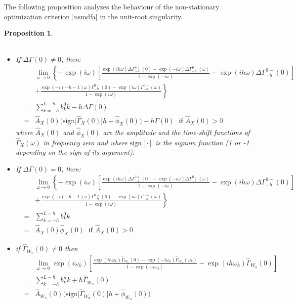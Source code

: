 \documentclass[11pt]{article}
\newtheorem{Proposition}{Proposition}
\begin{document}
\begin{appendix}
The following proposition analyzes the behaviour of the non-stationary optimization criterion \ref{nsmdfa} in the unit-root singularity.
\begin{Proposition}\label{singur}
~\\~
\begin{itemize}
\item If $\Delta\Gamma(0)\not=0$, then:
\begin{eqnarray*}
&&\lim_{\omega\to 0}\left\{-\exp(i\omega)\left[\frac{\exp(ih\omega)\Delta\Gamma_{-h}^{0+}(0)-\exp(-i\omega)\Delta\Gamma_{-h}^{0+}(\omega)}{1-\exp(-i\omega)}-\exp(ih\omega)\Delta\Gamma_{-h}^{0+}(0)\right]\right.\\
&&\left.+\frac{\exp(-i(-h-1)\omega)\Gamma_{-h}^{0-}(0)-\exp(i\omega)\Gamma_{-h}^{0-}(\omega)}{1-\exp(i\omega)}\right\}\\
&=&\sum_{k=-h}^{L-h} b_k^0k-h\Delta\Gamma(0)\\
&=&\hat{A}_X(0)\Big(\textrm{sign}\big[\hat{\Gamma}_X(0)\big]h+\hat{\phi}_X(0)\Big)-h\Gamma(0)  \textrm{~~if~} \hat{A}_X(0)>0
\end{eqnarray*}
where  $\hat{A}_X(0)$ and  $\hat{\phi}_X(0)$ are the amplitude and the time-shift functions of $\hat{\Gamma}_X(\omega)$ in frequency zero and where $\textrm{sign}[\cdot]$ is the signum function (1 or -1 depending on the sign of its argument).
\item  If $\Delta\Gamma(0)=0$, then:
\begin{eqnarray*}
&&\lim_{\omega\to 0}\left\{-\exp(i\omega)\left[\frac{\exp(ih\omega)\Delta\Gamma_{-h}^{0+}(0)-\exp(-i\omega)\Delta\Gamma_{-h}^{0+}(\omega)}{1-\exp(-i\omega)}-\exp(ih\omega)\Delta\Gamma_{-h}^{0+}(0)\right]\right.\\
&&\left.+\frac{\exp(-i(-h-1)\omega)\Gamma_{-h}^{0-}(0)-\exp(i\omega)\Gamma_{-h}^{0-}(\omega)}{1-\exp(i\omega)}\right\}\\
&=&\sum_{k=-h}^{L-h} b_k^0k\\
&=&\hat{A}_X(0)\hat{\phi}_X(0) \textrm{~~if~} \hat{A}_X(0)>0
\end{eqnarray*}
\item if $\hat{\Gamma}_{W_n}(0)\not=0$ then
\begin{eqnarray*}
&&\lim_{\omega\to 0}\exp(i\omega_k)\left[\frac{\exp(ih\omega_k)\hat{\Gamma}_{W_n}(0)-\exp(-i\omega_k)\hat{\Gamma}_{W_n}(\omega_k)}{1-\exp(-i\omega_k)}-\exp(ih\omega_k)\hat{\Gamma}_{W_n}(0)\right]\\
&=&\sum_{k=-h}^{L-h} b_k^nk+h\hat{\Gamma}_{W_n}(0)\\
&=&\hat{A}_{W_n}(0)\Big(\textrm{sign}\big[\hat{\Gamma}_{W_n}(0)\big]h+\hat{\phi}_{W_n}(0)\Big) 
\end{eqnarray*}
\end{itemize}
\end{Proposition}


\end{appendix}
\end{document}
